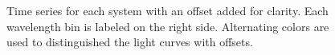 \documentclass[twocolumn]{aastex6}
\begin{document}
\begin{figure}[!t]
\centering
{}
	\caption{Time series for each system with an offset added for clarity. Each wavelength bin is labeled on the right side. Alternating colors are used to distinguished the light curves with offsets.}
	\label{fig:tserPfold}
\end{figure} 
\end{document}
